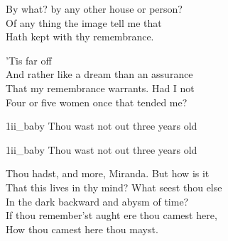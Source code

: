 	
\begin{verse_speech}[Prospero] 
By what? by any other house or person?\\
Of any thing the image tell me that\\
Hath kept with thy remembrance.
\end{verse_speech}

\begin{verse_speech}[Miranda] 
'Tis far off\\
And rather like a dream than an assurance\\
That my remembrance warrants. Had I not\\
Four or five women once that tended me?
\end{verse_speech}



\begin{pictures} %
	\begin{letter}
		\begin{colorbigpic}
			[1.1]
			{1ii_baby}
			{Thou wast not out three years old}
		\end{colorbigpic}
	\end{letter}

	\begin{a4}
		\begin{colorbigpic}
			[1]
			{1ii_baby}
			{Thou wast not out three years old}
		\end{colorbigpic}
	\end{a4}
\end{pictures}




\begin{verse_speech}[Prospero] 
Thou hadst, and more, Miranda. But how is it\\
That this lives in thy mind? What seest thou else\\
In the dark backward and abysm of time?\\
If thou remember'st aught ere thou camest here,\\
How thou camest here thou mayst.
\end{verse_speech}


